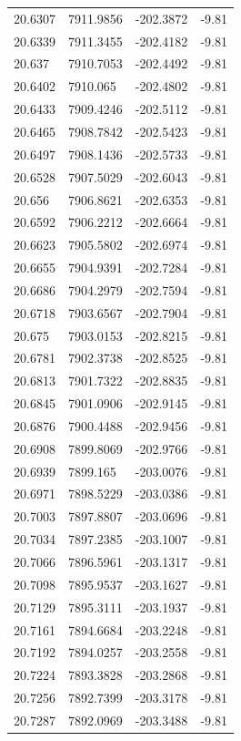 \begin{table}[H]
\begin{tabular}{llll}
20.6307 & 7911.9856 & -202.3872 & -9.81 \\
20.6339 & 7911.3455 & -202.4182 & -9.81 \\
20.637 & 7910.7053 & -202.4492 & -9.81 \\
20.6402 & 7910.065 & -202.4802 & -9.81 \\
20.6433 & 7909.4246 & -202.5112 & -9.81 \\
20.6465 & 7908.7842 & -202.5423 & -9.81 \\
20.6497 & 7908.1436 & -202.5733 & -9.81 \\
20.6528 & 7907.5029 & -202.6043 & -9.81 \\
20.656 & 7906.8621 & -202.6353 & -9.81 \\
20.6592 & 7906.2212 & -202.6664 & -9.81 \\
20.6623 & 7905.5802 & -202.6974 & -9.81 \\
20.6655 & 7904.9391 & -202.7284 & -9.81 \\
20.6686 & 7904.2979 & -202.7594 & -9.81 \\
20.6718 & 7903.6567 & -202.7904 & -9.81 \\
20.675 & 7903.0153 & -202.8215 & -9.81 \\
20.6781 & 7902.3738 & -202.8525 & -9.81 \\
20.6813 & 7901.7322 & -202.8835 & -9.81 \\
20.6845 & 7901.0906 & -202.9145 & -9.81 \\
20.6876 & 7900.4488 & -202.9456 & -9.81 \\
20.6908 & 7899.8069 & -202.9766 & -9.81 \\
20.6939 & 7899.165 & -203.0076 & -9.81 \\
20.6971 & 7898.5229 & -203.0386 & -9.81 \\
20.7003 & 7897.8807 & -203.0696 & -9.81 \\
20.7034 & 7897.2385 & -203.1007 & -9.81 \\
20.7066 & 7896.5961 & -203.1317 & -9.81 \\
20.7098 & 7895.9537 & -203.1627 & -9.81 \\
20.7129 & 7895.3111 & -203.1937 & -9.81 \\
20.7161 & 7894.6684 & -203.2248 & -9.81 \\
20.7192 & 7894.0257 & -203.2558 & -9.81 \\
20.7224 & 7893.3828 & -203.2868 & -9.81 \\
20.7256 & 7892.7399 & -203.3178 & -9.81 \\
20.7287 & 7892.0969 & -203.3488 & -9.81 \\

\end{tabular}
\end{table}
